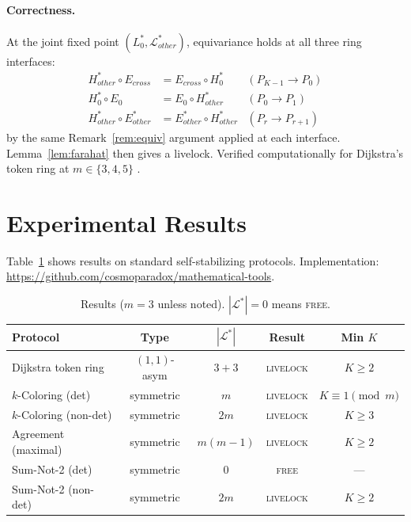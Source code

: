 \documentclass{article}
\newcommand{\Ls}{\mathcal{L}^{*}}
\newcommand{\Estar}{E^{*}}
\begin{document}
\paragraph{Correctness.}
At the joint fixed point $(L_0^*, \Ls_{\mathit{other}})$, equivariance
holds at all three ring interfaces:
\begin{align*}
  H^*_{\mathit{other}}\circ E_{\mathit{cross}}
    &= E_{\mathit{cross}}\circ H_0^*
  & (P_{K-1}\to P_0) \\
  H_0^*\circ E_0
    &= E_0\circ H^*_{\mathit{other}}
  & (P_0 \to P_1) \\
  H^*_{\mathit{other}}\circ\Estar_{\mathit{other}}
    &= \Estar_{\mathit{other}}\circ H^*_{\mathit{other}}
  & (P_r \to P_{r+1})
\end{align*}
by the same Remark~\ref{rem:equiv} argument applied at each interface.
Lemma~\ref{lem:farahat} then gives a livelock.
Verified computationally for Dijkstra's token ring at $m\in\{3,4,5\}$
\citep{farahat2012}.

\section{Experimental Results}

Table~\ref{tab:results} shows results on standard self-stabilizing
protocols. Implementation:
\url{https://github.com/cosmoparadox/mathematical-tools}.

\begin{table}[h]
\centering
\caption{Results ($m=3$ unless noted). $|\Ls|=0$ means \textsc{free}.}
\label{tab:results}
\smallskip
\begin{tabular}{lcccc}
\toprule
Protocol & Type & $|\Ls|$ & Result & Min $K$ \\
\midrule
Dijkstra token ring    & $(1,1)$-asym & $3{+}3$  & \textsc{livelock} & $K\!\geq\!2$\\
$k$-Coloring (det)     & symmetric    & $m$      & \textsc{livelock} & $K\!\equiv\!1\pmod{m}$\\
$k$-Coloring (non-det) & symmetric    & $2m$     & \textsc{livelock} & $K\!\geq\!3$\\
Agreement (maximal)    & symmetric    & $m(m{-}1)$ & \textsc{livelock} & $K\!\geq\!2$\\
Sum-Not-2 (det)        & symmetric    & $0$      & \textsc{free}     & ---\\
Sum-Not-2 (non-det)    & symmetric    & $2m$     & \textsc{livelock} & $K\!\geq\!2$\\
\bottomrule
\end{tabular}
\end{table}
\end{document}
